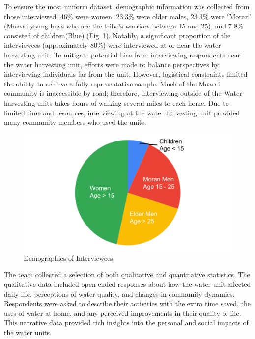 \documentclass[10pt, twocolumn]{article}
\begin{document}
To ensure the most uniform dataset, demographic information was collected from those interviewed: 46\% were women, 23.3\% were older males, 23.3\% were "Moran" (Maasai young boys who are the tribe’s warriors between 15 and 25), and 7-8\% consisted of children(Blue) (Fig~\ref{fig:demographics}). Notably, a significant proportion of the interviewees (approximately 80\%) were interviewed at or near the water harvesting unit. To mitigate potential bias from interviewing respondents near the water harvesting unit, efforts were made to balance perspectives by interviewing individuals far from the unit. However, logistical constraints limited the ability to achieve a fully representative sample. Much of the Maasai community is inaccessible by road; therefore, interviewing outside of the Water harvesting units takes hours of walking several miles to each home. Due to limited time and resources, interviewing at the water harvesting unit provided many community members who used the units.

\begin{figure}
    \centering
    \includegraphics[width=1\linewidth]{photos/demographic_split.png}
    \caption{Demographics of Interviewees}
    \label{fig:demographics}
\end{figure}

The team collected a selection of both qualitative and quantitative statistics. The qualitative data included open-ended responses about how the water unit affected daily life, perceptions of water quality, and changes in community dynamics. Respondents were asked to describe their activities with the extra time saved, the uses of water at home, and any perceived improvements in their quality of life. This narrative data provided rich insights into the personal and social impacts of the water units.
\end{document}
